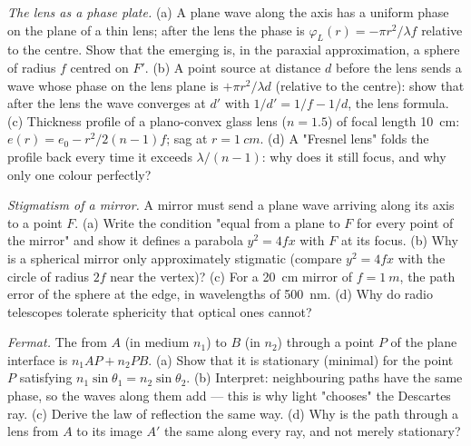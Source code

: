 \begin{exercise}[$\star\star$]\label{exo:b2:scalar-light-model:5}
\emph{The lens as a phase plate.} (a) A plane wave along the axis has a
uniform phase on the plane of a thin lens; after the lens the phase is
$\varphi_L(r) = -\pi r^2/\lambda f$ relative to the centre. Show that the emerging
 is, in the paraxial approximation, a sphere of radius $f$
centred on $F'$. (b) A point source at distance $d$ before the lens
sends a wave whose phase on the lens plane is $+\pi r^2/\lambda d$ (relative to
the centre): show that after the lens the wave converges at $d'$ with
$1/d' = 1/f - 1/d$, the lens formula. (c) Thickness profile of a
plano-convex glass lens ($n = 1.5$) of focal length \qty{10}{cm}: $e(r) =
e_0 - r^2/2(n - 1)f$; sag at $r = \qty{1}{cm}$. (d) A "Fresnel lens" folds
the profile back every time it exceeds $\lambda/(n - 1)$: why does it still
focus, and why only one colour perfectly?
\end{exercise}

\begin{exercise}[$\star\star$]\label{exo:b2:scalar-light-model:6}
\emph{Stigmatism of a mirror.} A mirror must send a plane wave arriving
along its axis to a point $F$. (a) Write the condition "equal  from a plane  to $F$ for every point of the mirror" and
show it defines a parabola $y^2 = 4fx$ with $F$ at its focus. (b) Why is a
spherical mirror only approximately stigmatic (compare $y^2 = 4fx$ with
the circle of radius $2f$ near the vertex)? (c) For a \qty{20}{cm} mirror
of $f = \qty{1}{m}$, the path error of the sphere at the edge, in
wavelengths of \qty{500}{nm}. (d) Why do radio telescopes tolerate
sphericity that optical ones cannot?
\end{exercise}

\begin{exercise}[$\star\star$]\label{exo:b2:scalar-light-model:7}
\emph{Fermat.} The  from $A$ (in medium $n_1$) to $B$ (in
$n_2$) through a point $P$ of the plane interface is $n_1AP + n_2PB$. (a)
Show that it is stationary (minimal) for the point $P$ satisfying
$n_1\sin\theta_1 = n_2\sin\theta_2$. (b) Interpret: neighbouring paths have the
same phase, so the waves along them add --- this is why light
"chooses" the Descartes ray. (c) Derive the law of reflection the same
way. (d) Why is the path through a lens from $A$ to its image $A'$ the
same along every ray, and not merely stationary?
\end{exercise}


